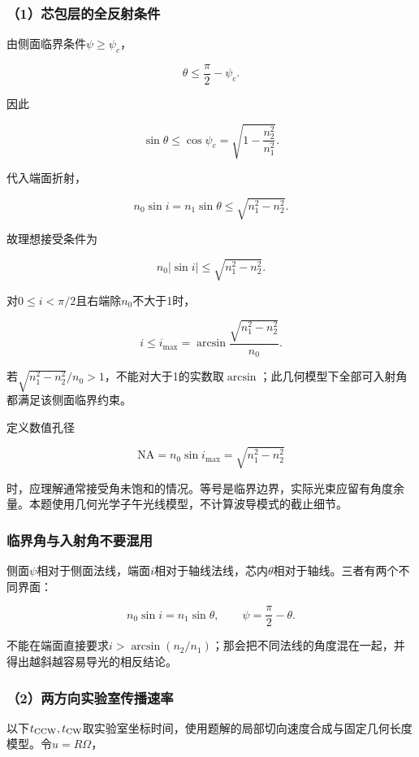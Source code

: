 \documentclass[12pt,a4paper,fontset=fandol]{ctexart}
\begin{document}
\subsubsection{（1）芯包层的全反射条件}\label{ux82afux5305ux5c42ux7684ux5168ux53cdux5c04ux6761ux4ef6}

由侧面临界条件\(\psi\geq\psi_c\)，

\[
\theta\leq\frac\pi2-\psi_c.
\]

因此

\[
\sin\theta\leq\cos\psi_c
=\sqrt{1-\frac{n_2^2}{n_1^2}}.
\]

代入端面折射，

\[
n_0\sin i=n_1\sin\theta
\leq\sqrt{n_1^2-n_2^2}.
\]

故理想接受条件为

\[
\boxed{n_0|\sin i|\leq\sqrt{n_1^2-n_2^2}}.
\]

对\(0\leq i<\pi/2\)且右端除\(n_0\)不大于1时，

\[
\boxed{
i\leq i_{\max}
=\arcsin\frac{\sqrt{n_1^2-n_2^2}}{n_0}}.
\]

若\(\sqrt{n_1^2-n_2^2}/n_0>1\)，不能对大于1的实数取\(\arcsin\)；此几何模型下全部可入射角都满足该侧面临界约束。

定义数值孔径

\[
\mathrm{NA}=n_0\sin i_{\max}
=\sqrt{n_1^2-n_2^2}
\]

时，应理解通常接受角未饱和的情况。等号是临界边界，实际光束应留有角度余量。本题使用几何光学子午光线模型，不计算波导模式的截止细节。

\subsubsection{临界角与入射角不要混用}\label{ux4e34ux754cux89d2ux4e0eux5165ux5c04ux89d2ux4e0dux8981ux6df7ux7528}

侧面\(\psi\)相对于侧面法线，端面\(i\)相对于轴线法线，芯内\(\theta\)相对于轴线。三者有两个不同界面：

\[
n_0\sin i=n_1\sin\theta,\qquad
\psi=\frac\pi2-\theta.
\]

不能在端面直接要求\(i>\arcsin(n_2/n_1)\)；那会把不同法线的角度混在一起，并得出越斜越容易导光的相反结论。

\subsubsection{（2）两方向实验室传播速率}\label{ux4e24ux65b9ux5411ux5b9eux9a8cux5ba4ux4f20ux64adux901fux7387}

以下\(t_{\rm CCW},t_{\rm CW}\)取实验室坐标时间，使用题解的局部切向速度合成与固定几何长度模型。令\(u=R\Omega\)，
\end{document}

